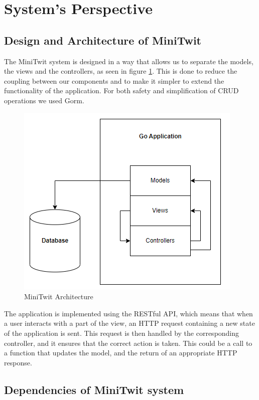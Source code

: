 \section{System's Perspective}

\subsection{Design and Architecture of MiniTwit}
The MiniTwit system is designed in a way that allows us to separate the models, the views and the controllers,
as seen in figure \ref{fig:minitwit}. This is done to reduce the coupling between our components and to make 
it simpler to extend the functionality of the application. For both safety and simplification of CRUD operations we used Gorm.

\begin{figure}[H]
    \centering
    \captionsetup{justification=centering,margin=1cm}
    \includegraphics[width=0.8\linewidth]{report/images/system_architecture.png}
    \caption{MiniTwit Architecture}
    \label{fig:minitwit}
\end{figure}

The application is implemented using the RESTful API, which means that when a user interacts with a part of the 
view, an HTTP request containing a new state of the application is sent. This request is then handled by the corresponding controller, and it ensures 
that the correct action is taken. This could be a call to a function that updates the model, and the return of 
an appropriate HTTP response. 


\subsection{Dependencies of MiniTwit system}

